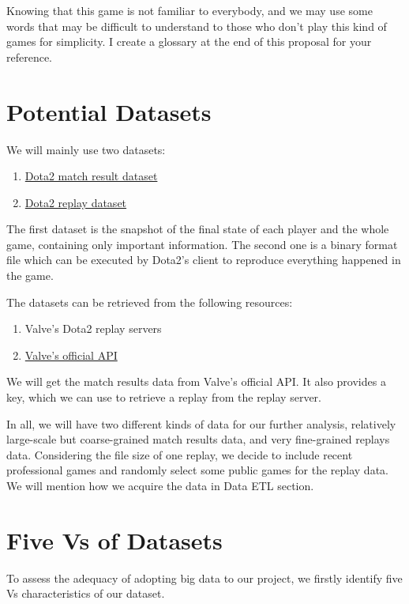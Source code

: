 \documentclass{article}
\begin{document}
Knowing that this game is not familiar to everybody, and we may use some words that may be difficult to understand to those who don't play this kind of games for simplicity. I create a glossary at the end of this proposal for your reference.
\section{Potential Datasets}
We will mainly use two datasets:

\begin{enumerate}
\item \href{https://wiki.teamfortress.com/wiki/WebAPI/GetMatchDetails}{Dota2 match result dataset}
\item \href{https://wiki.teamfortress.com/wiki/Replay}{Dota2 replay dataset}
\end{enumerate}

The first dataset is the snapshot of the final state of each player and the whole game, containing only important information.
The second one is a binary format file which can be executed by Dota2's client to reproduce everything happened in the game.

The datasets can be retrieved from the following resources:

\begin{enumerate}
\item Valve's Dota2 replay servers
\item \href{https://wiki.teamfortress.com/wiki/WebAPI}{Valve's official API}
\end{enumerate}

We will get the match results data from Valve's official API.
It also provides a key, which we can use to retrieve a replay from the replay server.

In all, we will have two different kinds of data for our further analysis, relatively large-scale but coarse-grained match results data, and very fine-grained replays data.
Considering the file size of one replay, we decide to include recent professional games and randomly select some public games for the replay data.
We will mention how we acquire the data in Data ETL section.

\section{Five Vs of Datasets}

To assess the adequacy of adopting big data to our project, we firstly identify five Vs characteristics of our dataset.
\end{document}
